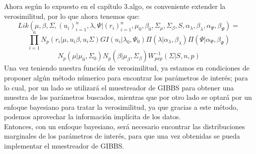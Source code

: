 \documentclass[11pt]{book}
\begin{document}
Ahora según lo expuesto en el capítulo 3.algo, es conveniente extender la verosimilitud, por lo que ahora tenemos que:
\begin{equation*}
Lik(\mu,\beta,\Sigma,(u_{i})_{i=1}^{n},\lambda,\Psi|(r_{i})_{i=1}^{n},\mu_{0},\beta_{0},\Sigma_{\mu},\Sigma_{\beta},S,\alpha_{\lambda},\beta_{\lambda},\alpha_{\Psi},\beta_{\Psi})=
\end{equation*}
\begin{equation*}
\prod_{i=1}^{n}N_{p}(r_{i}|\mu,u_{i}\beta,u_{i}\Sigma)GI(u_{i}|\lambda_{0},\Psi_{0})\Pi(\lambda|\alpha_{\lambda},\beta_{\lambda})\Pi(\Psi|\alpha_{\Psi},\beta_{\Psi}) 
\end{equation*}
\begin{equation*}
N_{p}(\mu|\mu_{0},\Sigma_{0})N_{p}(\beta|\mu_{\beta},\Sigma_{\beta})W^{-1}_{pxp}(\Sigma|S,n,p)
\end{equation*}
Una vez teniendo nuestra función de verosimilitud, ya estamos en condiciones de proponer algún método númerico para encontrar los parámetros de interés; para lo cual, por un lado se utilizará el muestreador de GIBBS para obtener una muestra de los parámetros buscados, mientras que por otro lado se optará por un enfoque bayesiano para tratar la verosimilitud, ya que gracias a este método, podemos aprovechar la información implícita de los datos.\\

Entonces, con un enfoque bayesiano, será necesario encontrar las distribuciones marginales de los parámetros de interés, para que una vez obtenidas se pueda implementar el muestreador de GIBBS.\\ 
\end{document}
